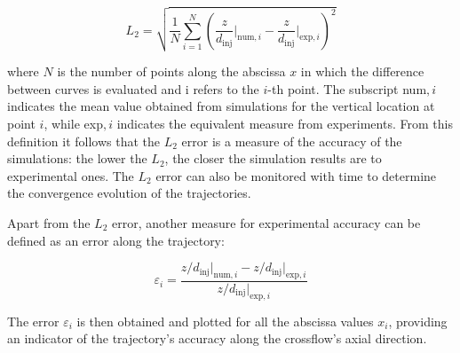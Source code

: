 \begin{equation}
\label{eq:L2_JICF}
    L_2 = \sqrt{\frac{1}{N}   \sum_{i=1}^N \left( \frac{z}{d_\mathrm{inj}} \Bigr|_{\mathrm{num},i} -   \frac{z}{d_\mathrm{inj}} \Bigr|_{\mathrm{exp},i} \right)^2}
\end{equation}

where $N$ is the number of points along the abscissa $x$ in which the difference between curves is evaluated and i refers to the $i$-th point. The subscript num$,i$ indicates the mean value obtained from simulations for the vertical location at point $i$, while exp$,i$ indicates the equivalent measure from experiments. From this definition it follows that the $L_2$ error is a measure of the accuracy of the simulations: the lower the $L_2$, the closer the simulation results are to experimental ones. The $L_2$ error can also be monitored with time to determine the convergence evolution of the trajectories.

Apart from the $L_2$ error, another measure for experimental accuracy can be defined as an error along the trajectory:



\begin{equation}
\label{eq:error_along_trajectory}
\varepsilon_i  =  \frac{ z/d_\mathrm{inj} \Bigr|_{\mathrm{num},i} - z/d_\mathrm{inj} \Bigr|_{\mathrm{exp},i} }{ z/d_\mathrm{inj} \Bigr|_{\mathrm{exp},i} }
\end{equation}

The error $\varepsilon_i$ is then obtained and plotted for all the abscissa values $x_i$, providing an indicator of the trajectory’s accuracy along the crossflow’s axial direction. \\


